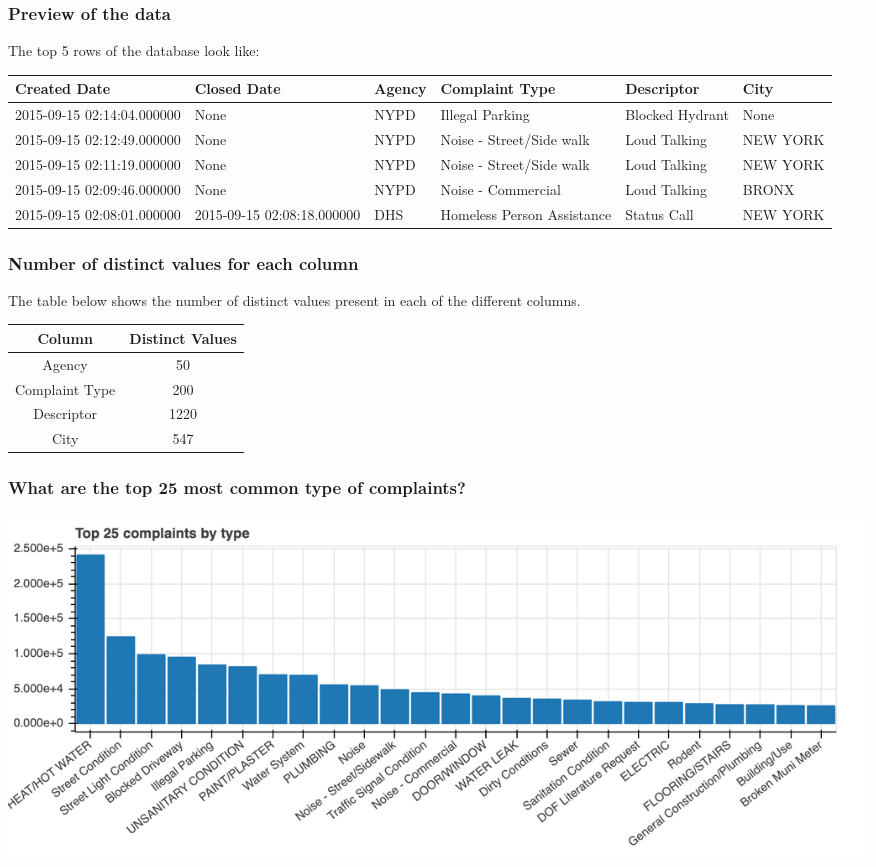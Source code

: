 \documentclass[10pt]{beamer}
\begin{document}
\begin{frame} \frametitle{Preview of the data}
The top 5 rows of the database look like:

\begin{center}
 \begin{tabular}{||p{2.15cm} p{2.15cm} p{0.75cm} p{1.5cm} p{1.5cm} p{1cm}||}
 \hline
 Created Date & Closed Date & Agency & Complaint Type & Descriptor & City \\ [0.5ex]
 \hline\hline
 2015-09-15 02:14:04.000000 & None & NYPD & Illegal Parking & Blocked Hydrant & None \\
 \hline
 2015-09-15 02:12:49.000000 & None & NYPD & Noise - Street/Side walk & Loud Talking & NEW YORK \\
 \hline
 2015-09-15 02:11:19.000000 & None & NYPD & Noise - Street/Side walk & Loud Talking & NEW YORK \\
 \hline
 2015-09-15 02:09:46.000000 & None & NYPD & Noise - Commercial & Loud Talking & BRONX \\
 \hline
 2015-09-15 02:08:01.000000 & 2015-09-15 02:08:18.000000 & DHS & Homeless Person Assistance & Status Call  & NEW YORK \\ [1ex]
 \hline
\end{tabular}
\end{center}

\end{frame}

\begin{frame} \frametitle{Number of distinct values for each column}
The table below shows the number of distinct values present in each of the different columns.
\begin{center}
 \begin{tabular}{||c c||}
 \hline
 Column & Distinct Values \\ [0.5ex]
 \hline\hline
Agency    & 50 \\
Complaint Type    & 200 \\
Descriptor   & 1220 \\
City   & 547 \\ [1ex]
 \hline
\end{tabular}
\end{center}
\end{frame}

\begin{frame} \frametitle{What are the top 25 most common type of complaints?}
\includegraphics[scale=0.21]{top25complaints}
\end{frame}
\end{document}
